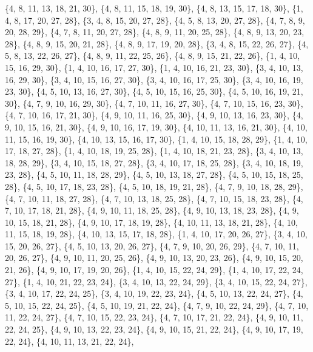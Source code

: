 \documentclass[11pt,a4paper]{article}
\begin{document}
{\{4, 8, 11, 13, 18, 21, 30\}, \{4, 8, 11, 15, 18, 19, 30\}, \{4, 8, 13, 15, 17, 18, 30\}, \{1, 4, 8, 17, 20, 27, 28\}, \{3, 4, 8, 15, 20, 27, 28\},
\{4, 5, 8, 13, 20, 27, 28\}, \{4, 7, 8, 9, 20, 28, 29\}, \{4, 7, 8, 11, 20, 27, 28\}, \{4, 8, 9, 11, 20, 25, 28\}, \{4, 8, 9, 13, 20, 23, 28\},
\{4, 8, 9, 15, 20, 21, 28\}, \{4, 8, 9, 17, 19, 20, 28\}, \{3, 4, 8, 15, 22, 26, 27\}, \{4, 5, 8, 13, 22, 26, 27\}, \{4, 8, 9, 11, 22, 25, 26\},
\{4, 8, 9, 15, 21, 22, 26\}, \{1, 4, 10, 15, 16, 29, 30\}, \{1, 4, 10, 16, 17, 27, 30\}, \{1, 4, 10, 16, 21, 23, 30\}, \{3, 4, 10, 13, 16, 29, 30\},
\{3, 4, 10, 15, 16, 27, 30\}, \{3, 4, 10, 16, 17, 25, 30\}, \{3, 4, 10, 16, 19, 23, 30\}, \{4, 5, 10, 13, 16, 27, 30\}, \{4, 5, 10, 15, 16, 25, 30\},
\{4, 5, 10, 16, 19, 21, 30\}, \{4, 7, 9, 10, 16, 29, 30\}, \{4, 7, 10, 11, 16, 27, 30\}, \{4, 7, 10, 15, 16, 23, 30\}, \{4, 7, 10, 16, 17, 21, 30\},
\{4, 9, 10, 11, 16, 25, 30\}, \{4, 9, 10, 13, 16, 23, 30\}, \{4, 9, 10, 15, 16, 21, 30\}, \{4, 9, 10, 16, 17, 19, 30\}, \{4, 10, 11, 13, 16, 21, 30\},
\{4, 10, 11, 15, 16, 19, 30\}, \{4, 10, 13, 15, 16, 17, 30\}, \{1, 4, 10, 15, 18, 28, 29\}, \{1, 4, 10, 17, 18, 27, 28\}, \{1, 4, 10, 18, 19, 25, 28\},
\{1, 4, 10, 18, 21, 23, 28\}, \{3, 4, 10, 13, 18, 28, 29\}, \{3, 4, 10, 15, 18, 27, 28\}, \{3, 4, 10, 17, 18, 25, 28\}, \{3, 4, 10, 18, 19, 23, 28\},
\{4, 5, 10, 11, 18, 28, 29\}, \{4, 5, 10, 13, 18, 27, 28\}, \{4, 5, 10, 15, 18, 25, 28\}, \{4, 5, 10, 17, 18, 23, 28\}, \{4, 5, 10, 18, 19, 21, 28\},
\{4, 7, 9, 10, 18, 28, 29\}, \{4, 7, 10, 11, 18, 27, 28\}, \{4, 7, 10, 13, 18, 25, 28\}, \{4, 7, 10, 15, 18, 23, 28\}, \{4, 7, 10, 17, 18, 21, 28\},
\{4, 9, 10, 11, 18, 25, 28\}, \{4, 9, 10, 13, 18, 23, 28\}, \{4, 9, 10, 15, 18, 21, 28\}, \{4, 9, 10, 17, 18, 19, 28\}, \{4, 10, 11, 13, 18, 21, 28\},
\{4, 10, 11, 15, 18, 19, 28\}, \{4, 10, 13, 15, 17, 18, 28\}, \{1, 4, 10, 17, 20, 26, 27\}, \{3, 4, 10, 15, 20, 26, 27\}, \{4, 5, 10, 13, 20, 26, 27\},
\{4, 7, 9, 10, 20, 26, 29\}, \{4, 7, 10, 11, 20, 26, 27\}, \{4, 9, 10, 11, 20, 25, 26\}, \{4, 9, 10, 13, 20, 23, 26\}, \{4, 9, 10, 15, 20, 21, 26\},
\{4, 9, 10, 17, 19, 20, 26\}, \{1, 4, 10, 15, 22, 24, 29\}, \{1, 4, 10, 17, 22, 24, 27\}, \{1, 4, 10, 21, 22, 23, 24\}, \{3, 4, 10, 13, 22, 24, 29\},
\{3, 4, 10, 15, 22, 24, 27\}, \{3, 4, 10, 17, 22, 24, 25\}, \{3, 4, 10, 19, 22, 23, 24\}, \{4, 5, 10, 13, 22, 24, 27\}, \{4, 5, 10, 15, 22, 24, 25\},
\{4, 5, 10, 19, 21, 22, 24\}, \{4, 7, 9, 10, 22, 24, 29\}, \{4, 7, 10, 11, 22, 24, 27\}, \{4, 7, 10, 15, 22, 23, 24\}, \{4, 7, 10, 17, 21, 22, 24\},
\{4, 9, 10, 11, 22, 24, 25\}, \{4, 9, 10, 13, 22, 23, 24\}, \{4, 9, 10, 15, 21, 22, 24\}, \{4, 9, 10, 17, 19, 22, 24\}, \{4, 10, 11, 13, 21, 22, 24\},
}
\end{document}
